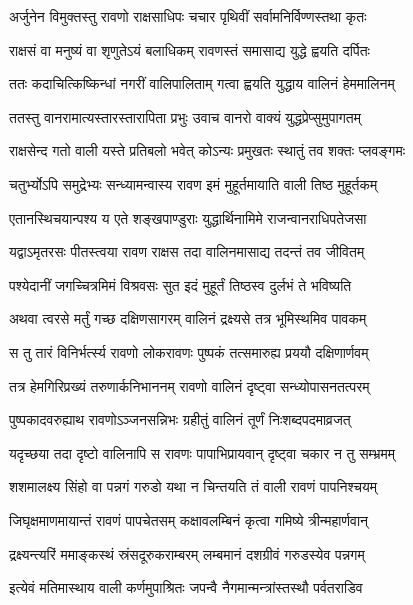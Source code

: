 
\twolineshloka
{अर्जुनेन विमुक्तस्तु रावणो राक्षसाधिपः}
{चचार पृथिवीं सर्वामनिर्विण्णस्तथा कृतः} %

\twolineshloka
{राक्षसं वा मनुष्यं वा शृणुतेऽयं बलाधिकम्}
{रावणस्तं समासाद्य युद्धे ह्वयति दर्पितः} %

\twolineshloka
{ततः कदाचित्किष्किन्धां नगरीं वालिपालिताम्}
{गत्वा ह्वयति युद्धाय वालिनं हेममालिनम्} %

\twolineshloka
{ततस्तु वानरामात्यस्तारस्तारापिता प्रभुः}
{उवाच वानरो वाक्यं युद्धप्रेप्सुमुपागतम्} %

\twolineshloka
{राक्षसेन्द गतो वाली यस्ते प्रतिबलो भवेत्}
{कोऽन्यः प्रमुखतः स्थातुं तव शक्तः प्लवङ्गमः} %

\twolineshloka
{चतुर्भ्योऽपि समुद्रेभ्यः सन्ध्यामन्वास्य रावण}
{इमं मुहूर्तमायाति वाली तिष्ठ मुहूर्तकम्} %

\twolineshloka
{एतानस्थिचयान्पश्य य एते शङ्खपाण्डुराः}
{युद्धार्थिनामिमे राजन्वानराधिपतेजसा} %

\twolineshloka
{यद्वाऽमृतरसः पीतस्त्वया रावण राक्षस}
{तदा वालिनमासाद्य तदन्तं तव जीवितम्} %

\twolineshloka
{पश्येदानीं जगच्चित्रमिमं विश्रवसः सुत}
{इदं मुहूर्तं तिष्ठस्व दुर्लभं ते भविष्यति} %

\twolineshloka
{अथवा त्वरसे मर्तुं गच्छ दक्षिणसागरम्}
{वालिनं द्रक्ष्यसे तत्र भूमिस्थमिव पावकम्} %

\twolineshloka
{स तु तारं विनिर्भर्त्स्य रावणो लोकरावणः}
{पुष्पकं तत्समारुह्य प्रययौ दक्षिणार्णवम्} %

\twolineshloka
{तत्र हेमगिरिप्रख्यं तरुणार्कनिभाननम्}
{रावणो वालिनं दृष्ट्वा सन्ध्योपासनतत्परम्} %

\twolineshloka
{पुष्पकादवरुह्याथ रावणोऽञ्जनसन्निभः}
{ग्रहीतुं वालिनं तूर्णं निःशब्दपदमाव्रजत्} %

\twolineshloka
{यदृच्छया तदा दृष्टो वालिनापि स रावणः}
{पापाभिप्रायवान् दृष्ट्वा चकार न तु सम्भ्रमम्} %

\twolineshloka
{शशमालक्ष्य सिंहो वा पन्नगं गरुडो यथा}
{न चिन्तयति तं वाली रावणं पापनिश्चयम्} %

\twolineshloka
{जिघृक्षमाणमायान्तं रावणं पापचेतसम्}
{कक्षावलम्बिनं कृत्वा गमिष्ये त्रीन्महार्णवान्} %

\twolineshloka
{द्रक्ष्यन्त्यरिं ममाङ्कस्थं स्रंसदूरुकराम्बरम्}
{लम्बमानं दशग्रीवं गरुडस्येव पन्नगम्} %

\twolineshloka
{इत्येवं मतिमास्थाय वाली कर्णमुपाश्रितः}
{जपन्वै नैगमान्मन्त्रांस्तस्थौ पर्वतराडिव} %

